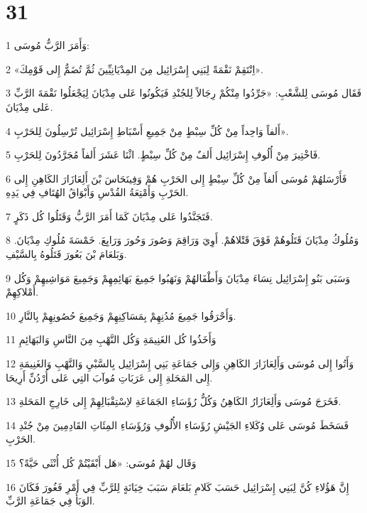 \chapter{31}

\par 1 وَأَمَرَ الرَّبُّ مُوسَى:
\par 2 «اِنْتَقِمْ نَقْمَةً لِبَنِي إِسْرَائِيل مِنَ المِدْيَانِيِّينَ ثُمَّ تُضَمُّ إِلى قَوْمِكَ».
\par 3 فَقَال مُوسَى لِلشَّعْبِ: «جَرِّدُوا مِنْكُمْ رِجَالاً لِلجُنْدِ فَيَكُونُوا عَلى مِدْيَانَ لِيَجْعَلُوا نَقْمَةَ الرَّبِّ عَلى مِدْيَانَ.
\par 4 أَلفاً وَاحِداً مِنْ كُلِّ سِبْطٍ مِنْ جَمِيعِ أَسْبَاطِ إِسْرَائِيل تُرْسِلُونَ لِلحَرْبِ».
\par 5 فَاخْتِيرَ مِنْ أُلُوفِ إِسْرَائِيل أَلفٌ مِنْ كُلِّ سِبْطٍ. اثْنَا عَشَرَ أَلفاً مُجَرَّدُونَ لِلحَرْبِ.
\par 6 فَأَرْسَلهُمْ مُوسَى أَلفاً مِنْ كُلِّ سِبْطٍ إِلى الحَرْبِ هُمْ وَفِينَحَاسَ بْنَ أَلِعَازَارَ الكَاهِنِ إِلى الحَرْبِ وَأَمْتِعَةُ القُدْسِ وَأَبْوَاقُ الهُتَافِ فِي يَدِهِ.
\par 7 فَتَجَنَّدُوا عَلى مِدْيَانَ كَمَا أَمَرَ الرَّبُّ وَقَتَلُوا كُل ذَكَرٍ.
\par 8 وَمُلُوكُ مِدْيَانَ قَتَلُوهُمْ فَوْقَ قَتْلاهُمْ. أَوِيَ وَرَاقِمَ وَصُورَ وَحُورَ وَرَابِعَ. خَمْسَةَ مُلُوكِ مِدْيَانَ. وَبَلعَامَ بْنَ بَعُورَ قَتَلُوهُ بِالسَّيْفِ.
\par 9 وَسَبَى بَنُو إِسْرَائِيل نِسَاءَ مِدْيَانَ وَأَطْفَالهُمْ وَنَهَبُوا جَمِيعَ بَهَائِمِهِمْ وَجَمِيعَ مَوَاشِيهِمْ وَكُل أَمْلاكِهِمْ.
\par 10 وَأَحْرَقُوا جَمِيعَ مُدُنِهِمْ بِمَسَاكِنِهِمْ وَجَمِيعَ حُصُونِهِمْ بِالنَّارِ.
\par 11 وَأَخَذُوا كُل الغَنِيمَةِ وَكُل النَّهْبِ مِنَ النَّاسِ وَالبَهَائِمِ
\par 12 وَأَتُوا إِلى مُوسَى وَأَلِعَازَارَ الكَاهِنِ وَإِلى جَمَاعَةِ بَنِي إِسْرَائِيل بِالسَّبْيِ وَالنَّهْبِ وَالغَنِيمَةِ إِلى المَحَلةِ إِلى عَرَبَاتِ مُوآبَ التِي عَلى أُرْدُنِّ أَرِيحَا.
\par 13 فَخَرَجَ مُوسَى وَأَلِعَازَارُ الكَاهِنُ وَكُلُّ رُؤَسَاءِ الجَمَاعَةِ لاِسْتِقْبَالِهِمْ إِلى خَارِجِ المَحَلةِ.
\par 14 فَسَخَطَ مُوسَى عَلى وُكَلاءِ الجَيْشِ رُؤَسَاءِ الأُلُوفِ وَرُؤَسَاءِ المِئَاتِ القَادِمِينَ مِنْ جُنْدِ الحَرْبِ.
\par 15 وَقَال لهُمْ مُوسَى: «هَل أَبْقَيْتُمْ كُل أُنْثَى حَيَّةً؟
\par 16 إِنَّ هَؤُلاءِ كُنَّ لِبَنِي إِسْرَائِيل حَسَبَ كَلامِ بَلعَامَ سَبَبَ خِيَانَةٍ لِلرَّبِّ فِي أَمْرِ فَغُورَ فَكَانَ الوَبَأُ فِي جَمَاعَةِ الرَّبِّ.
